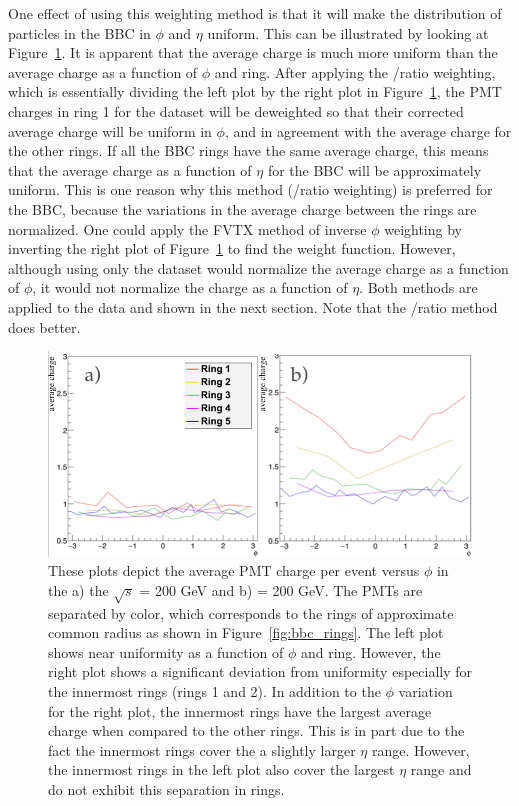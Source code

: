 One effect of using this weighting method is that it will make the distribution of particles in the BBC in $\phi$ and $\eta $ uniform. This can be illustrated by looking at Figure~\ref{fig:bbc_pmt_phi_pp_pau}. It is apparent that the \pp average charge is much more uniform than the \pau average charge as a function of $\phi$ and ring. After applying the \pp/\pau ratio weighting, which is essentially dividing the left plot by the right plot in Figure~\ref{fig:bbc_pmt_phi_pp_pau}, the PMT charges in ring 1 for the \pau dataset will be deweighted so that their corrected average charge will be uniform in $\phi$, and in agreement with the average charge for the other rings. If all the BBC rings have the same average charge, this means that the average charge as a function of $\eta$ for the BBC will be approximately uniform. This is one reason why this method (\pp/\pau ratio weighting) is preferred for the BBC, because the variations in the average charge between the rings are normalized. One could apply the FVTX method of inverse $\phi$ weighting by inverting the right plot of Figure~\ref{fig:bbc_pmt_phi_pp_pau} to find the weight function. However, although using only the \pau dataset would normalize the average charge as a function of $\phi$, it would not normalize the charge as a function of $\eta$. Both methods are applied to the data and shown in the next section. Note that the \pp/\pau ratio method does better.

\begin{figure}[!ht]
\begin{center}
\includegraphics[width=0.75\linewidth]{figs/pp_pau_bbc_comparison.png}
\caption{These plots depict the average PMT charge per event versus $\phi$ in the a) the \pp $\sqrt{s}$ = 200 GeV and b) \pau \sqsn = 200 GeV. The PMTs are separated by color, which corresponds to the rings of approximate common radius as shown in Figure~\ref{fig:bbc_rings}. The left plot shows near uniformity as a function of $\phi$ and ring. However, the right plot shows a significant deviation from uniformity especially for the innermost rings (rings 1 and 2). In addition to the $\phi$ variation for the right plot, the innermost rings have the largest average charge when compared to the other rings. This is in part due to the fact the innermost rings cover the a slightly larger $\eta$ range. However, the innermost rings in the left plot also cover the largest $\eta$ range and do not exhibit this separation in rings. }
\label{fig:bbc_pmt_phi_pp_pau}
\end{center}
\end{figure}

